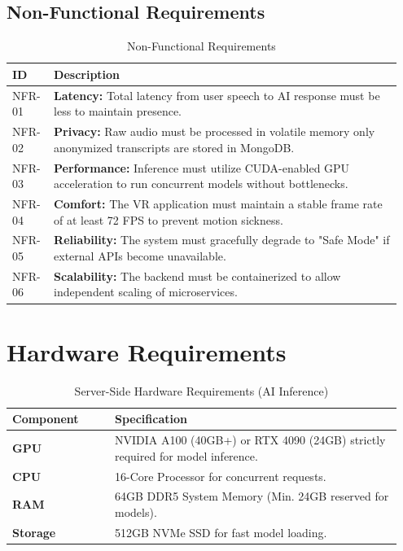 \subsection{Non-Functional Requirements}
\begin{table}[H]
\centering
\renewcommand{\arraystretch}{1.3}
\caption{Non-Functional Requirements}
\label{tab:non-functional-req}
\begin{tabular}{|p{0.1\linewidth}|p{0.85\linewidth}|}
\hline
\rowcolor{gray!15} \textbf{ID} & \textbf{Description} \\ \hline
NFR-01 & \textbf{Latency:} Total latency from user speech to AI response must be less to maintain presence. \\ \hline
NFR-02 & \textbf{Privacy:} Raw audio must be processed in volatile memory only anonymized transcripts are stored in MongoDB. \\ \hline
NFR-03 & \textbf{Performance:} Inference must utilize CUDA-enabled GPU acceleration to run concurrent models without bottlenecks. \\ \hline
NFR-04 & \textbf{Comfort:} The VR application must maintain a stable frame rate of at least 72 FPS to prevent motion sickness. \\ \hline
NFR-05 & \textbf{Reliability:} The system must gracefully degrade to "Safe Mode" if external APIs become unavailable. \\ \hline
NFR-06 & \textbf{Scalability:} The backend must be containerized to allow independent scaling of microservices. \\ \hline
\end{tabular}
\end{table}

\section{Hardware Requirements}
\begin{table}[H]
\centering
\renewcommand{\arraystretch}{1.3}
\caption{Server-Side Hardware Requirements (AI Inference)}
\label{tab:hardware-server-req}
\begin{tabular}{|p{0.25\linewidth}|p{0.7\linewidth}|}
\hline
\rowcolor{gray!15} \textbf{Component} & \textbf{Specification} \\ \hline
\textbf{GPU} & NVIDIA A100 (40GB+) or RTX 4090 (24GB) strictly required for model inference. \\ \hline
\textbf{CPU} & 16-Core Processor for concurrent requests. \\ \hline
\textbf{RAM} & 64GB DDR5 System Memory (Min. 24GB reserved for models). \\ \hline
\textbf{Storage} & 512GB NVMe SSD for fast model loading. \\ \hline
\end{tabular}
\end{table}

